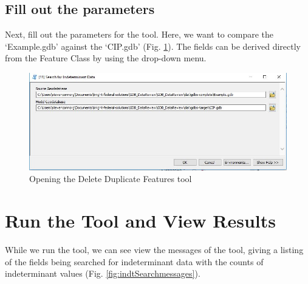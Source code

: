 \documentclass[openany]{book}
\theoremstyle{definition}
\theoremstyle{definition}
\theoremstyle{definition}
\theoremstyle{remark}
\begin{document}
\subsection{Fill out the parameters}\label{fill-out-the-parameters-7}

Next, fill out the parameters for the tool. Here, we want to compare the
`Example.gdb' against the `CIP.gdb' (Fig. \ref{fig:indtSearchparams}).
The fields can be derived directly from the Feature Class by using the
drop-down menu.

\begin{figure}[H]

{\centering \includegraphics{figures/indtSearch-params} 

}

\caption{Opening the Delete Duplicate Features tool}\label{fig:indtSearchparams}
\end{figure}

\section{Run the Tool and View
Results}\label{run-the-tool-and-view-results-7}

While we run the tool, we can see view the messages of the tool, giving
a listing of the fields being searched for indeterminant data with the
counts of indeterminant values (Fig. \ref{fig:indtSearchmessages}).
\end{document}
